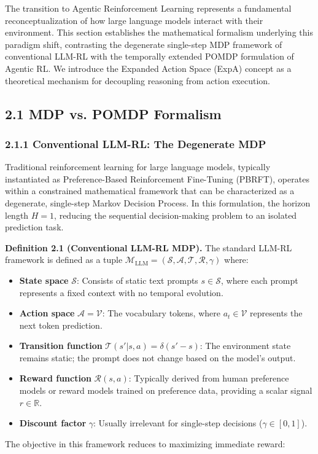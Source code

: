 The transition to Agentic Reinforcement Learning represents a fundamental reconceptualization of how large language models interact with their environment. This section establishes the mathematical formalism underlying this paradigm shift, contrasting the degenerate single-step MDP framework of conventional LLM-RL with the temporally extended POMDP formulation of Agentic RL. We introduce the Expanded Action Space (ExpA) concept as a theoretical mechanism for decoupling reasoning from action execution.

\subsection{2.1 MDP vs. POMDP Formalism}

\subsubsection{2.1.1 Conventional LLM-RL: The Degenerate MDP}

Traditional reinforcement learning for large language models, typically instantiated as Preference-Based Reinforcement Fine-Tuning (PBRFT), operates within a constrained mathematical framework that can be characterized as a degenerate, single-step Markov Decision Process. In this formulation, the horizon length $H = 1$, reducing the sequential decision-making problem to an isolated prediction task.

\textbf{Definition 2.1 (Conventional LLM-RL MDP).} The standard LLM-RL framework is defined as a tuple $\mathcal{M}_{\text{LLM}} = (\mathcal{S}, \mathcal{A}, \mathcal{T}, \mathcal{R}, \gamma)$ where:

\begin{itemize}
    \item \textbf{State space} $\mathcal{S}$: Consists of static text prompts $s \in \mathcal{S}$, where each prompt represents a fixed context with no temporal evolution.

    \item \textbf{Action space} $\mathcal{A} = \mathcal{V}$: The vocabulary tokens, where $a_t \in \mathcal{V}$ represents the next token prediction.

    \item \textbf{Transition function} $\mathcal{T}(s' | s, a) = \delta(s' - s)$: The environment state remains static; the prompt does not change based on the model's output.

    \item \textbf{Reward function} $\mathcal{R}(s, a)$: Typically derived from human preference models or reward models trained on preference data, providing a scalar signal $r \in \mathbb{R}$.

    \item \textbf{Discount factor} $\gamma$: Usually irrelevant for single-step decisions ($\gamma \in [0, 1]$).

\end{itemize}
The objective in this framework reduces to maximizing immediate reward:


